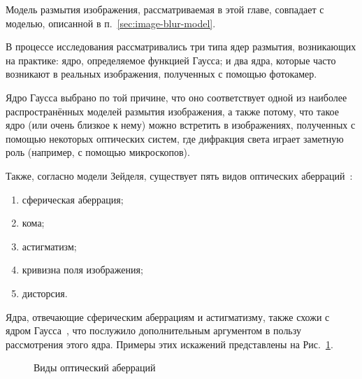 Модель размытия изображения, рассматриваемая в этой главе, совпадает с моделью, описанной в п.~\ref{sec:image-blur-model}.

В процессе исследования рассматривались три типа ядер размытия, возникающих на практике: ядро, определяемое функцией Гаусса; и два ядра, которые часто возникают в реальных изображения, полученных с помощью фотокамер.

Ядро Гаусса выбрано по той причине, что оно соответствует одной из наиболее распространённых моделей размытия изображения, а также потому, что такое ядро (или очень близкое к нему) можно встретить в изображениях, полученных с помощью некоторых оптических систем, где дифракция света играет заметную роль (например, с помощью микроскопов).

Также, согласно модели Зейделя, существует пять видов оптических аберраций~\cite{simpkins2014parameterized}:
\begin{enumerate}[beginpenalty=10000]
	\item сферическая аберрация;
	\item кома;
	\item астигматизм;
	\item кривизна поля изображения;
	\item дисторсия.
\end{enumerate}

Ядра, отвечающие сферическим аберрациям и астигматизму, также схожи с ядром Гаусса~\cite{simpkins2014parameterized, simpkins2011modeling}, что послужило дополнительным аргументом в пользу рассмотрения этого ядра. Примеры этих искажений представлены на Рис.~\ref{fig:warping-aberrations}.

\begin{figure}[ht]
	\caption{Виды оптический аберраций~\cite{simpkins2011modeling}}
	\label{fig:warping-aberrations}
\end{figure}

